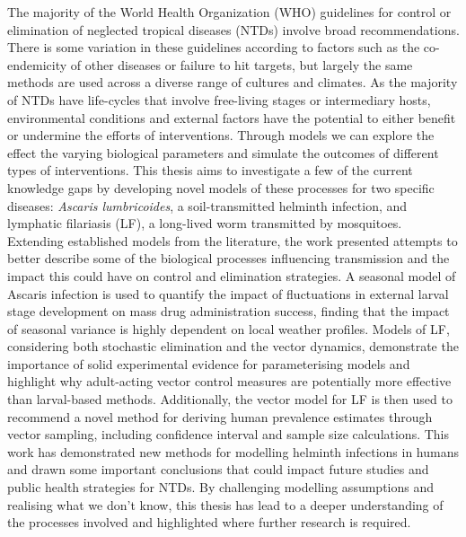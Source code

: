 \documentclass[11pt,a4paper]{report}      %
\begin{document}
\begin{thesisabstract}
\begin{onehalfspace}       
\noindent The majority of the World Health Organization (WHO) guidelines for control or elimination of neglected tropical diseases (NTDs) involve broad recommendations. There is some variation in these guidelines according to factors such as the co-endemicity of other diseases or failure to hit targets, but largely the same methods are used across a diverse range of cultures and climates. As the majority of NTDs have life-cycles that involve free-living stages or intermediary hosts, environmental conditions and external factors have the potential to either benefit or undermine the efforts of interventions. Through models we can explore the effect the varying biological parameters and simulate the outcomes of different types of interventions. This thesis aims to investigate a few of the current knowledge gaps by developing novel models of these processes for two specific diseases: \textit{Ascaris lumbricoides}, a soil-transmitted helminth infection, and lymphatic filariasis (LF), a long-lived worm transmitted by mosquitoes. Extending established models from the literature, the work presented attempts to better describe some of the biological processes influencing transmission and the impact this could have on control and elimination strategies. A seasonal model of Ascaris infection is used to quantify the impact of fluctuations in external larval stage development on mass drug administration success, finding that the impact of seasonal variance is highly dependent on local weather profiles. Models of LF, considering both stochastic elimination and the vector dynamics, demonstrate the importance of solid experimental evidence for parameterising models and highlight why adult-acting vector control measures are potentially more effective than larval-based methods. Additionally, the vector model for LF is then used to recommend a novel method for deriving human prevalence estimates through vector sampling, including confidence interval and sample size calculations. This work has demonstrated new methods for modelling helminth infections in humans and drawn some important conclusions that could impact future studies and public health strategies for NTDs. By challenging modelling assumptions and realising what we don't know, this thesis has lead to a deeper understanding of the processes involved and highlighted where further research is required.


\end{onehalfspace}
\end{thesisabstract}
\end{document}
